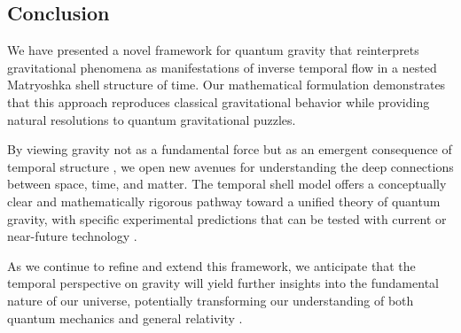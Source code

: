 \documentclass[12pt,a4paper]{article}
\begin{document}
\subsection{Conclusion}

We have presented a novel framework for quantum gravity that reinterprets gravitational phenomena as manifestations of inverse temporal flow in a nested Matryoshka shell structure of time. Our mathematical formulation demonstrates that this approach reproduces classical gravitational behavior while providing natural resolutions to quantum gravitational puzzles.

By viewing gravity not as a fundamental force but as an emergent consequence of temporal structure \citep{emergent}, we open new avenues for understanding the deep connections between space, time, and matter. The temporal shell model offers a conceptually clear and mathematically rigorous pathway toward a unified theory of quantum gravity, with specific experimental predictions that can be tested with current or near-future technology \citep{cow, neutron, atominterferometry}.

As we continue to refine and extend this framework, we anticipate that the temporal perspective on gravity will yield further insights into the fundamental nature of our universe, potentially transforming our understanding of both quantum mechanics \citep{nielsen} and general relativity \citep{hawking}.



\end{document}
